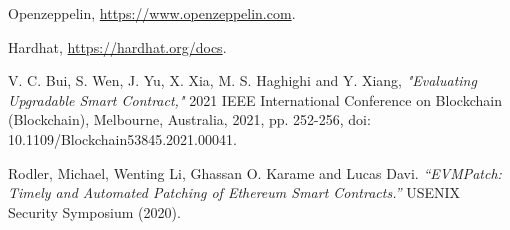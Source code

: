 \documentclass[english, LaM, oneside]{sapthesis}%
\begin{document}
\begin{thebibliography}{17}
Openzeppelin, \url{https://www.openzeppelin.com}.

Hardhat, \url{https://hardhat.org/docs}.

V. C. Bui, S. Wen, J. Yu, X. Xia, M. S. Haghighi and Y. Xiang, \textit{"Evaluating Upgradable Smart Contract,"} 2021 IEEE International Conference on Blockchain (Blockchain), Melbourne, Australia, 2021, pp. 252-256, doi: 10.1109/Blockchain53845.2021.00041.

Rodler, Michael, Wenting Li, Ghassan O. Karame and Lucas Davi. \textit{“EVMPatch: Timely and Automated Patching of Ethereum Smart Contracts.”} USENIX Security Symposium (2020).



\end{thebibliography}
\end{document}
